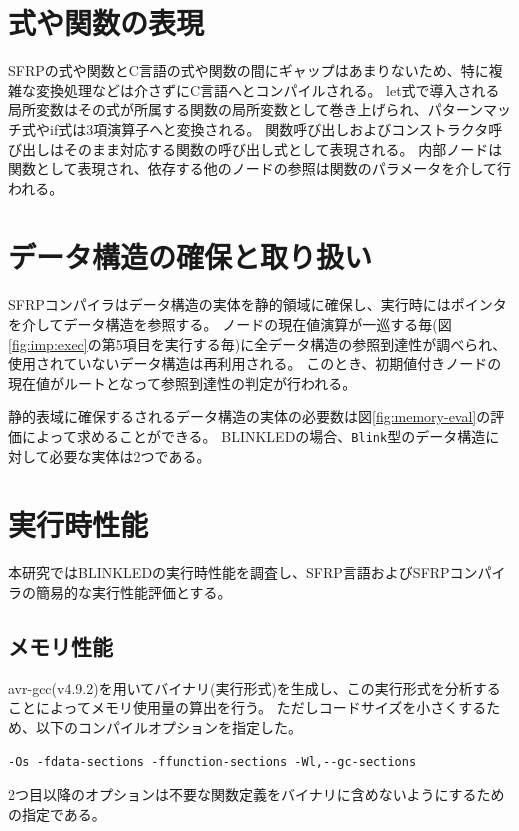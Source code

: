 \section{式や関数の表現}\label{sec:implementation:expression}
SFRPの式や関数とC言語の式や関数の間にギャップはあまりないため、特に複雑な変換処理などは介さずにC言語へとコンパイルされる。
let式で導入される局所変数はその式が所属する関数の局所変数として巻き上げられ、パターンマッチ式やif式は3項演算子へと変換される。
関数呼び出しおよびコンストラクタ呼び出しはそのまま対応する関数の呼び出し式として表現される。
内部ノードは関数として表現され、依存する他のノードの参照は関数のパラメータを介して行われる。

\section{データ構造の確保と取り扱い}\label{sec:implementation:data}
SFRPコンパイラはデータ構造の実体を静的領域に確保し、実行時にはポインタを介してデータ構造を参照する。
ノードの現在値演算が一巡する毎(図\ref{fig:imp:exec}の第5項目を実行する毎)に全データ構造の参照到達性が調べられ、使用されていないデータ構造は再利用される。
このとき、初期値付きノードの現在値がルートとなって参照到達性の判定が行われる。

静的表域に確保するされるデータ構造の実体の必要数は図\ref{fig:memory-eval}の評価によって求めることができる。
BLINKLEDの場合、\texttt{Blink}型のデータ構造に対して必要な実体は2つである。


\section{実行時性能}\label{sec:implementation:performance}
本研究ではBLINKLEDの実行時性能を調査し、SFRP言語およびSFRPコンパイラの簡易的な実行性能評価とする。

\subsection{メモリ性能}
avr-gcc(v4.9.2)を用いてバイナリ(実行形式)を生成し、この実行形式を分析することによってメモリ使用量の算出を行う。
ただしコードサイズを小さくするため、以下のコンパイルオプションを指定した。
\begin{lstlisting}[basicstyle=\ttfamily\small,numbers=none,frame=none]
-Os -fdata-sections -ffunction-sections -Wl,--gc-sections
\end{lstlisting}
2つ目以降のオプションは不要な関数定義をバイナリに含めないようにするための指定である。

